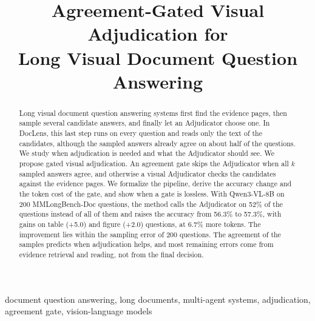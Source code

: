 \documentclass[conference]{IEEEtran}
\begin{document}
\title{Agreement-Gated Visual Adjudication for\\Long Visual Document Question Answering}

\author{
}

\maketitle

\begin{abstract}
Long visual document question answering systems first find the evidence pages, then sample several candidate answers, and finally let an Adjudicator choose one. In DocLens, this last step runs on every question and reads only the text of the candidates, although the sampled answers already agree on about half of the questions. We study when adjudication is needed and what the Adjudicator should see. We propose gated visual adjudication. An agreement gate skips the Adjudicator when all $k$ sampled answers agree, and otherwise a visual Adjudicator checks the candidates against the evidence pages. We formalize the pipeline, derive the accuracy change and the token cost of the gate, and show when a gate is lossless. With Qwen3-VL-8B on 200 MMLongBench-Doc questions, the method calls the Adjudicator on 52\% of the questions instead of all of them and raises the accuracy from 56.3\% to 57.3\%, with gains on table (+5.0) and figure (+2.0) questions, at 6.7\% more tokens. The improvement lies within the sampling error of 200 questions. The agreement of the samples predicts when adjudication helps, and most remaining errors come from evidence retrieval and reading, not from the final decision.
\end{abstract}

\begin{IEEEkeywords}
document question answering, long documents, multi-agent systems, adjudication, agreement gate, vision-language models
\end{IEEEkeywords}





\end{document}
